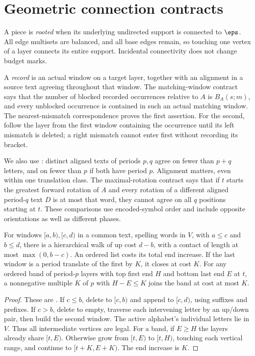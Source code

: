 \section{Geometric connection contracts}\label{sec:operations}
A piece is \emph{rooted} when its underlying undirected support is
connected to $\eps$. All edge multisets are balanced, and all base edges
remain, so touching one vertex of a layer connects its entire support.
Incidental connectivity does not change budget marks.

A \emph{record} is an actual window on a target layer, together with
an alignment in a source text agreeing throughout that window.
The matching-window contract  says
that the number of blocked recorded occurrences relative to $A$ is
$B_A(s;m)$, and every unblocked occurrence is contained in such an
actual matching window. The nearest-mismatch correspondence proves
the first assertion. For the second, follow the layer from the first
window containing the occurrence until its left mismatch is deleted;
a right mismatch cannot enter first without recording its bracket.

We also use : distinct aligned texts of
periods $p,q$ agree on fewer than $p+q$ letters, and on fewer than $p$
if both have period $p$. Alignment matters, even within one translation
class. The maximal-rotation contract 
says that if $t$ starts the greatest forward rotation of $A$ and every
rotation of a different aligned period-$q$ text $D$ is at most that
word, they cannot agree on all $q$ positions starting at $t$.
These comparisons use encoded-symbol order and include opposite
orientations as well as different phases.

\begin{lemma}\label{lem:windows}
For windows $[a,b),[c,d)$ in a common text, spelling words in $V$,
with $a\le c$ and $b\le d$, there is a hierarchical walk of up cost
$d-b$, with a contact of length at most $\max(0,b-c)$.
An ordered list costs its total end increase. If the last window is
a period translate of the first by $K$, it closes at cost $K$.
For any ordered band of period-$p$ layers with top first end $H$
and bottom last end $E$ at $t$, a nonnegative multiple $K$ of $p$
with $H-E\le K$ joins the band at cost at most $K$.
\end{lemma}
\begin{proof}
These are .
If $c\le b$, delete to $[c,b)$ and append to $[c,d)$, using suffixes
and prefixes. If $c>b$, delete to empty, traverse each intervening
letter by an up/down pair, then build the second window. The active
alphabet's individual letters lie in $V$. Thus all intermediate vertices
are legal. For a band, if $E\ge H$ the layers already share $[t,E)$.
Otherwise grow from $[t,E)$ to $[t,H)$, touching each vertical range,
and continue to $[t+K,E+K)$. The end increase is $K$.
\end{proof}

